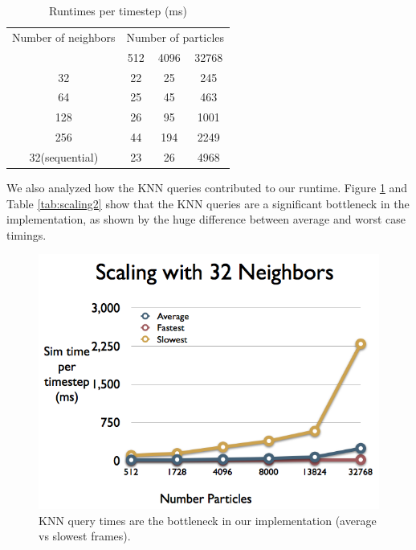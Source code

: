\documentclass[cameraready]{acmsiggraph-awb}
\begin{document}
\begin{table}[htdp]
\caption{Runtimes per timestep (ms)}
\begin{center}
\begin{tabular}{c|ccc}
Number of neighbors& \multicolumn{3}{c}{Number of particles} \\
&512&   4096&   32768 \\ \hline

32& 22&	25&	245 \\
64& 25&	45&	463 \\
128& 26	&95	&1001 \\
256& 44	&194&	2249 \\
32(sequential)& 23	&26	&4968  \\
\end{tabular}
\end{center}
\label{tab:scaling1}
\end{table}%


We also analyzed how the KNN queries contributed to our runtime.  Figure \ref{fig:scaling2} and Table \ref{tab:scaling2} show that the KNN queries are a significant bottleneck in the implementation, as shown by the huge difference between average and worst case timings.  


\begin{figure}
\begin{centering}
\includegraphics[width = 5in]{Figures/charts_002.png}
\caption{KNN query times are the bottleneck in our implementation (average vs slowest frames).}
\label{fig:scaling2}
\end{centering}
\end{figure}
\end{document}
